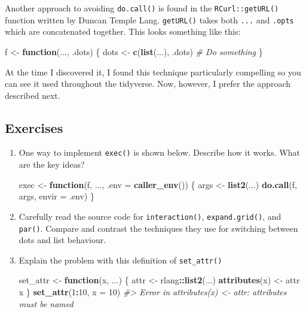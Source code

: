 \documentclass[]{book}
\newenvironment{Shaded}{\begin{snugshade}}{\end{snugshade}}
\newcommand{\CommentTok}[1]{\textcolor[rgb]{0.37,0.37,0.37}{\textit{#1}}}
\newcommand{\ControlFlowTok}[1]{\textcolor[rgb]{0.27,0.27,0.27}{\textbf{#1}}}
\newcommand{\DataTypeTok}[1]{\textcolor[rgb]{0.27,0.27,0.27}{#1}}
\newcommand{\DecValTok}[1]{\textcolor[rgb]{0.06,0.06,0.06}{#1}}
\newcommand{\KeywordTok}[1]{\textcolor[rgb]{0.27,0.27,0.27}{\textbf{#1}}}
\newcommand{\NormalTok}[1]{#1}
\newcommand{\OperatorTok}[1]{\textcolor[rgb]{0.43,0.43,0.43}{\textbf{#1}}}
\newcommand{\StringTok}[1]{\textcolor[rgb]{0.5,0.5,0.5}{#1}}
\begin{document}
Another approach to avoiding \texttt{do.call()} is found in the \texttt{RCurl::getURL()} function written by Duncan Temple Lang. \texttt{getURL()} takes both \texttt{...} and \texttt{.opts} which are concatenated together. This looks something like this:

\begin{Shaded}
\begin{Highlighting}[]
\NormalTok{f <-}\StringTok{ }\ControlFlowTok{function}\NormalTok{(..., .dots) \{}
\NormalTok{  dots <-}\StringTok{ }\KeywordTok{c}\NormalTok{(}\KeywordTok{list}\NormalTok{(...), .dots)}
  \CommentTok{# Do something}
\NormalTok{\}}
\end{Highlighting}
\end{Shaded}

At the time I discovered it, I found this technique particularly compelling so you can see it used throughout the tidyverse. Now, however, I prefer the approach described next.

\hypertarget{exercises-7}{%
\subsection{Exercises}\label{exercises-7}}

\begin{enumerate}
\def\labelenumi{\arabic{enumi}.}
\item
  One way to implement \texttt{exec()} is shown below. Describe how it works. What are the
  key ideas?

\begin{Shaded}
\begin{Highlighting}[]
\NormalTok{exec <-}\StringTok{ }\ControlFlowTok{function}\NormalTok{(f, ..., }\DataTypeTok{.env =} \KeywordTok{caller_env}\NormalTok{()) \{}
\NormalTok{  args <-}\StringTok{ }\KeywordTok{list2}\NormalTok{(...)}
  \KeywordTok{do.call}\NormalTok{(f, args, }\DataTypeTok{envir =}\NormalTok{ .env)}
\NormalTok{\}}
\end{Highlighting}
\end{Shaded}
\item
  Carefully read the source code for \texttt{interaction()}, \texttt{expand.grid()}, and
  \texttt{par()}. Compare and contrast the techniques they use for switching
  between dots and list behaviour.
\item
  Explain the problem with this definition of \texttt{set\_attr()}

\begin{Shaded}
\begin{Highlighting}[]
\NormalTok{set_attr <-}\StringTok{ }\ControlFlowTok{function}\NormalTok{(x, ...) \{}
\NormalTok{  attr <-}\StringTok{ }\NormalTok{rlang}\OperatorTok{::}\KeywordTok{list2}\NormalTok{(...)}
  \KeywordTok{attributes}\NormalTok{(x) <-}\StringTok{ }\NormalTok{attr}
\NormalTok{  x}
\NormalTok{\}}
\KeywordTok{set_attr}\NormalTok{(}\DecValTok{1}\OperatorTok{:}\DecValTok{10}\NormalTok{, }\DataTypeTok{x =} \DecValTok{10}\NormalTok{)}
\CommentTok{#> Error in attributes(x) <- attr: attributes must be named}
\end{Highlighting}
\end{Shaded}
\end{enumerate}
\end{document}
